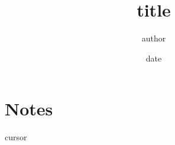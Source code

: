\documentclass[11pt]{article}
\title{ {{title}} }
\author{ {{author}} }
\date{ {{date}} }
\begin{document}
\maketitle

\section{Notes}
{{cursor}}
\end{document}
